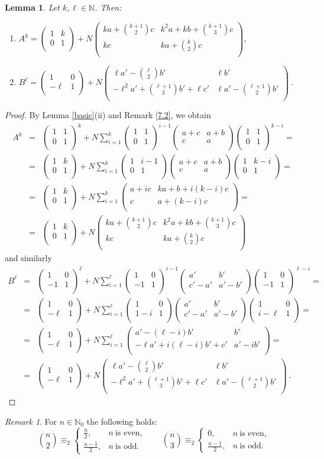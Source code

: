 \documentclass[10pt]{amsart}
\theoremstyle{plain}
\newtheorem{lemma}[theorem]{Lemma}
\theoremstyle{definition}
\theoremstyle{remark}%
\newtheorem{remark}[theorem]{Remark}
\newcommand{\N}{\mathbb{N}}
\newcommand{\mat}[4]{\left(\begin{array}{cc}
 #1 & #2\\
 #3 & #4\\
\end{array}\right)}
\begin{document}
\begin{lemma}\label{7.4}
Let $k,\ell\in\N$. Then:
\begin{enumerate}
\item[(i)] $A^k=\mat{1}{k}{0}{1}+N\mat{ka+{k+1\choose 2}c}{k^2a+kb+{k+1\choose 3}c}{kc}{ka+{k\choose 2}c}$,

\item[(ii)] $B^\ell=\mat{1}{0}{-\ell}{1}+N\mat{\ell a'-{\ell\choose 2}b'}{\ell b'}{-\ell^2a'+{\ell+1\choose 3}b'+\ell c'}{\ell a'-{\ell+1\choose 2}b'}\ .$
\end{enumerate}
\end{lemma}
\begin{proof}
By Lemma \ref{basic}(ii) and Remark \ref{7.2}, we obtain
\begin{eqnarray*}
A^k&=&\mat{1}{1}{0}{1}^k+N\sum\limits^{k}_{i=1}\mat{1}{1}{0}{1}^{i-1}\mat{a+c}{a+b}{c}{a}\mat{1}{1}{0}{1}^{k-i}=\\
&=&\mat{1}{k}{0}{1}+N\sum\limits^{k}_{i=1}\mat{1}{i-1}{0}{1}\mat{a+c}{a+b}{c}{a}\mat{1}{k-i}{0}{1}=\\
&=&\mat{1}{k}{0}{1}+N\sum\limits^{k}_{i=1}\mat{a+ic}{ka+b+i(k-i)c}{c}{a+(k-i)c}=\\
&=&\mat{1}{k}{0}{1}+N\mat{ka+{k+1\choose 2}c}{k^2a+kb+{k+1\choose 3}c}{kc}{ka+{k\choose 2}c}
\end{eqnarray*}
and similarly
\begin{eqnarray*}
B^\ell&=&\mat{1}{0}{-1}{1}^\ell+N\sum\limits^{\ell}_{i=1}\mat{1}{0}{-1}{1}^{i-1}\mat{a'}{b'}{c'-a'}{a'-b'}\mat{1}{0}{-1}{1}^{\ell-i}=\\
&=&\mat{1}{0}{-\ell}{1}+N\sum\limits^{\ell}_{i=1}\mat{1}{0}{1-i}{1}\mat{a'}{b'}{c'-a'}{a'-b'}\mat{1}{0}{i-\ell}{1}=\\
&=&\mat{1}{0}{-\ell}{1}+N\sum\limits^{\ell}_{i=1}\mat{a'-(\ell-i)b'}{b'}{-\ell a'+i(\ell-i)b'+c'}{a'-ib'}=\\
&=&\mat{1}{0}{-\ell}{1}+N\mat{\ell a'-{\ell \choose 2}b'}{\ell b'}{-\ell^2a'+{\ell+1\choose 3}b'+\ell c'}{\ell a'-{\ell+1\choose 2}b'}\ .
\end{eqnarray*}
\end{proof}

\begin{remark}\label{7.5}
For $n\in\N_0$ the following holds:
 $${n\choose 2}\equiv_2 
 \begin{cases}
 \frac{n}{2}, & n \ \text{is even,}\\[2mm]
\frac{n-1}{2}, & n \ \text{is odd.}
\end{cases}
\ \ \ \  \ \ \ \ \
{n\choose 3}\equiv_2 
\begin{cases}
0, & n \ \text{is even,}\\[2mm]
\frac{n-1}{2}, & n \ \text{is odd.}
\end{cases}                     
$$
\end{remark}
\end{document}
